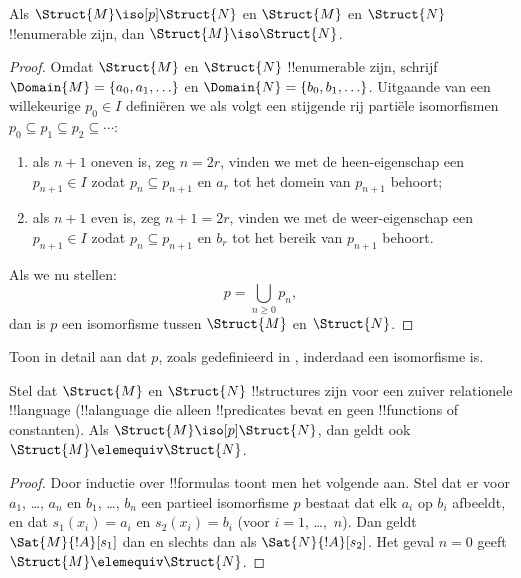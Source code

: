 \documentclass[openany]{memoir}
\begin{document}
\begin{thm}
  Als $\Struct{M} \iso[p] \Struct{N}$ en $\Struct{M}$ en
  $\Struct{N}$ !!{enumerable} zijn, dan $\Struct{M} \iso
  \Struct{N}$.
\end{thm}

\begin{proof}
  Omdat $\Struct{M}$ en $\Struct{N}$ !!{enumerable} zijn, schrijf
  $\Domain{M} = \{a_0, a_1, \ldots \}$ en $\Domain{N} =
  \{b_0, b_1, \ldots \}$. Uitgaande van een willekeurige $p_0 \in I$
  definiëren we als volgt een stijgende rij partiële isomorfismen
  $p_0 \subseteq p_1 \subseteq p_2 \subseteq \cdots$:
  \begin{enumerate}
  \item als $n+1$ oneven is, zeg $n = 2r$, vinden we met de
    heen-eigenschap een $p_{n+1} \in I$ zodat $p_n \subseteq p_{n+1}$
    en $a_r$ tot het domein van $p_{n+1}$ behoort;
  \item als $n+1$ even is, zeg $n+1 =2r$, vinden we met de
    weer-eigenschap een $p_{n+1} \in I$ zodat $p_n \subseteq p_{n+1}$
    en $b_r$ tot het bereik van $p_{n+1}$ behoort.
  \end{enumerate}
Als we nu stellen:
\[
p = \bigcup_{n\ge 0} p_n,
\]
dan is $p$ een isomorfisme tussen $\Struct{M}$ en
$\Struct{N}$.
\end{proof}

\begin{prob}
  Toon in detail aan dat $p$, zoals gedefinieerd in
  , inderdaad een isomorfisme is.
\end{prob}

\begin{thm}
  Stel dat $\Struct{M}$ en $\Struct{N}$ !!{structure}s zijn voor een
  zuiver relationele !!{language} (!!a{language} die alleen
  !!{predicate}s bevat en geen !!{function}s of constanten). Als
  $\Struct{M} \iso[p] \Struct{N}$, dan geldt ook
  $\Struct{M} \elemequiv \Struct{N}$.
\end{thm}

\begin{proof}
  Door inductie over !!{formula}s toont men het volgende aan. Stel dat
  er voor $a_1$, \dots, $a_n$ en $b_1$, \dots, $b_n$ een partieel
  isomorfisme $p$ bestaat dat elk $a_i$ op $b_i$ afbeeldt, en dat
  $s_1(x_i) =a_i$ en $s_2(x_i) =b_i$ (voor $i =1$, \dots,~$n$).
  Dan geldt $\Sat{M}{!A}[s_1]$ dan en slechts dan als
  $\Sat{N}{!A}[s_2]$. Het geval $n=0$ geeft
  $\Struct{M} \elemequiv \Struct{N}$.
\end{proof}
\end{document}
